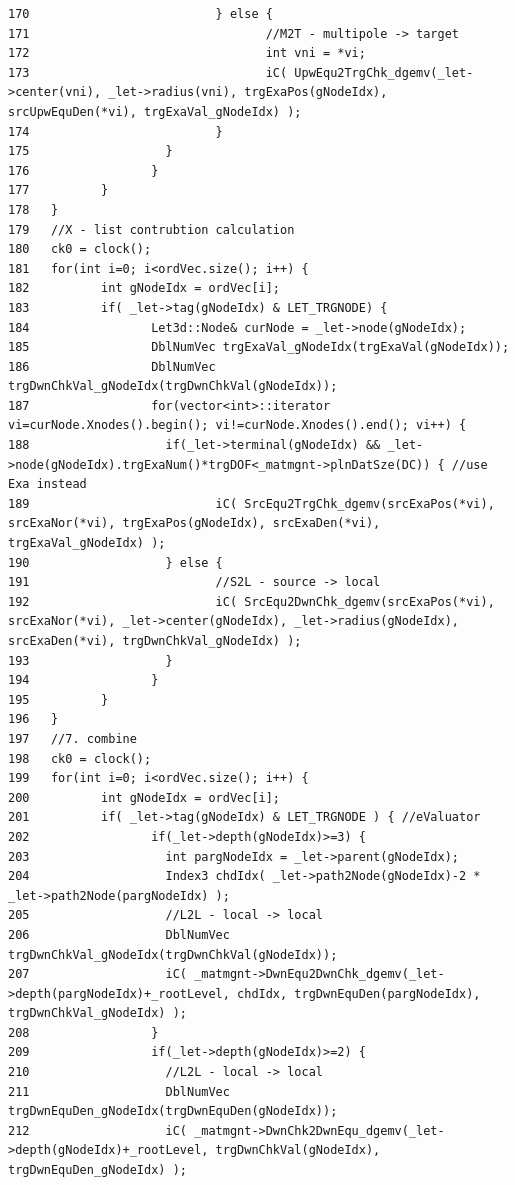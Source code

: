 \begin{verbatim}
170                          } else {
171                                 //M2T - multipole -> target
172                                 int vni = *vi;                          
173                                 iC( UpwEqu2TrgChk_dgemv(_let->center(vni), _let->radius(vni), trgExaPos(gNodeIdx), srcUpwEquDen(*vi), trgExaVal_gNodeIdx) );
174                          }
175                   }
176                 }
177          }
178   }
179   //X - list contrubtion calculation
180   ck0 = clock();
181   for(int i=0; i<ordVec.size(); i++) {
182          int gNodeIdx = ordVec[i];
183          if( _let->tag(gNodeIdx) & LET_TRGNODE) {       
184                 Let3d::Node& curNode = _let->node(gNodeIdx);
185                 DblNumVec trgExaVal_gNodeIdx(trgExaVal(gNodeIdx));
186                 DblNumVec trgDwnChkVal_gNodeIdx(trgDwnChkVal(gNodeIdx));
187                 for(vector<int>::iterator vi=curNode.Xnodes().begin(); vi!=curNode.Xnodes().end(); vi++) {
188                   if(_let->terminal(gNodeIdx) && _let->node(gNodeIdx).trgExaNum()*trgDOF<_matmgnt->plnDatSze(DC)) { //use Exa instead
189                          iC( SrcEqu2TrgChk_dgemv(srcExaPos(*vi), srcExaNor(*vi), trgExaPos(gNodeIdx), srcExaDen(*vi), trgExaVal_gNodeIdx) );
190                   } else {
191                          //S2L - source -> local
192                          iC( SrcEqu2DwnChk_dgemv(srcExaPos(*vi), srcExaNor(*vi), _let->center(gNodeIdx), _let->radius(gNodeIdx), srcExaDen(*vi), trgDwnChkVal_gNodeIdx) );
193                   }
194                 }
195          }
196   }
197   //7. combine
198   ck0 = clock();
199   for(int i=0; i<ordVec.size(); i++) {
200          int gNodeIdx = ordVec[i];
201          if( _let->tag(gNodeIdx) & LET_TRGNODE ) { //eValuator          
202                 if(_let->depth(gNodeIdx)>=3) {
203                   int pargNodeIdx = _let->parent(gNodeIdx);     
204                   Index3 chdIdx( _let->path2Node(gNodeIdx)-2 * _let->path2Node(pargNodeIdx) );
205                   //L2L - local -> local
206                   DblNumVec trgDwnChkVal_gNodeIdx(trgDwnChkVal(gNodeIdx));
207                   iC( _matmgnt->DwnEqu2DwnChk_dgemv(_let->depth(pargNodeIdx)+_rootLevel, chdIdx, trgDwnEquDen(pargNodeIdx), trgDwnChkVal_gNodeIdx) );
208                 }
209                 if(_let->depth(gNodeIdx)>=2) {
210                   //L2L - local -> local
211                   DblNumVec trgDwnEquDen_gNodeIdx(trgDwnEquDen(gNodeIdx));
212                   iC( _matmgnt->DwnChk2DwnEqu_dgemv(_let->depth(gNodeIdx)+_rootLevel, trgDwnChkVal(gNodeIdx), trgDwnEquDen_gNodeIdx) );

\end{verbatim}
